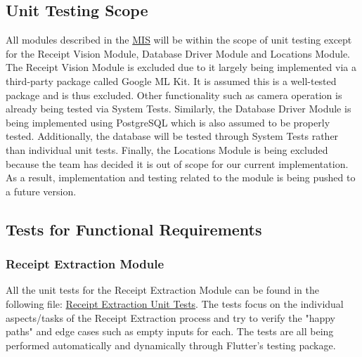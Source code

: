 \documentclass[12pt, titlepage]{article}
\begin{document}
\subsection{Unit Testing Scope}

  All modules described in the \href{https://github.com/r-yeh/grocery-spending-tracker/blob/master/docs/Design/SoftDetailedDes/MIS.pdf}{MIS}
  will be within the scope of unit testing except for the Receipt Vision Module, Database
  Driver Module and Locations Module. The Receipt Vision Module is excluded due to it largely being implemented via a third-party
  package called Google ML Kit. It is assumed this is a well-tested package and is thus excluded. Other functionality
  such as camera operation is already being tested via System Tests. Similarly, the Database Driver Module is being implemented
  using PostgreSQL which is also assumed to be properly tested. Additionally, the database will be tested through
  System Tests rather than individual unit tests. Finally, the Locations Module is being excluded because the team
  has decided it is out of scope for our current implementation. As a result, implementation and testing related to
  the module is being pushed to a future version.

\subsection{Tests for Functional Requirements}


  \subsubsection{Receipt Extraction Module}

  All the unit tests for the Receipt Extraction Module can be found in the following file: 
  \href{https://github.com/allanfang1/grocery_spending_tracker_app/blob/main/test/receipt_extraction_test.dart}{Receipt Extraction
  Unit Tests}. The tests focus on the individual aspects/tasks of the Receipt Extraction process and try to verify
  the "happy paths" and edge cases such as empty inputs for each. The tests are all being performed automatically
  and dynamically through Flutter's testing package.
\end{document}
